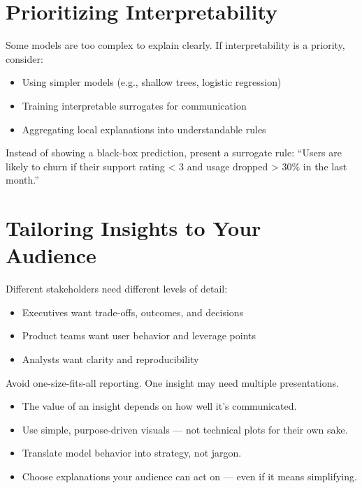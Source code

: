 \documentclass[12pt,openany]{book}
\begin{document}
\section{Prioritizing Interpretability}

Some models are too complex to explain clearly. If interpretability is a priority, consider:
\begin{itemize}
  \item Using simpler models (e.g., shallow trees, logistic regression)
  \item Training interpretable surrogates for communication
  \item Aggregating local explanations into understandable rules
\end{itemize}

\begin{examplebox}
Instead of showing a black-box prediction, present a surrogate rule: “Users are likely to churn if their support rating < 3 and usage dropped > 30\% in the last month.”
\end{examplebox}



\section{Tailoring Insights to Your Audience}

Different stakeholders need different levels of detail:
\begin{itemize}
  \item Executives want trade-offs, outcomes, and decisions
  \item Product teams want user behavior and leverage points
  \item Analysts want clarity and reproducibility
\end{itemize}

\begin{notebox}
Avoid one-size-fits-all reporting. One insight may need multiple presentations.
\end{notebox}

\begin{summarybox}
\begin{itemize}
  \item The value of an insight depends on how well it’s communicated.
  \item Use simple, purpose-driven visuals — not technical plots for their own sake.
  \item Translate model behavior into strategy, not jargon.
  \item Choose explanations your audience can act on — even if it means simplifying.
\end{itemize}
\end{summarybox}
\end{document}

